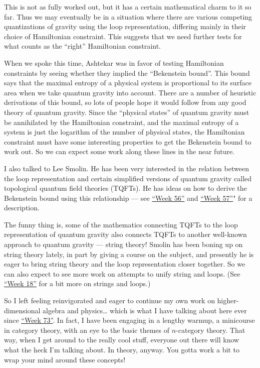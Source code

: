 \documentclass{article}
\begin{document}
This is not as fully worked out, but it has a certain mathematical charm
to it so far. Thus we may eventually be in a situation where there are
various competing quantizations of gravity using the loop
representation, differing mainly in their choice of Hamiltonian
constraint. This suggests that we need further tests for what counts as
the ``right'' Hamiltonian constraint.

When we spoke this time, Ashtekar was in favor of testing Hamiltonian
constraints by seeing whether they implied the ``Bekenstein bound''.
This bound says that the maximal entropy of a physical system is
proportional to its surface area when we take quantum gravity into
account. There are a number of heuristic derivations of this bound, so
lots of people hope it would follow from any good theory of quantum
gravity. Since the ``physical states'' of quantum gravity must be
annihilated by the Hamiltonian constraint, and the maximal entropy of a
system is just the logarithm of the number of physical states, the
Hamiltonian constraint must have some interesting properties to get the
Bekenstein bound to work out. So we can expect some work along these
lines in the near future.

I also talked to Lee Smolin. He has been very interested in the relation
between the loop representation and certain simplified versions of
quantum gravity called topological quantum field theories (TQFTs). He
has ideas on how to derive the Bekenstein bound using this relationship
--- see \href{week56.html}{``Week 56''} and
\protect\hyperlink{week57}{``Week 57''}" for a description.

The funny thing is, some of the mathematics connecting TQFTs to the loop
representation of quantum gravity also connects TQFTs to another
well-known approach to quantum gravity --- string theory! Smolin has
been boning up on string theory lately, in part by giving a course on
the subject, and presently he is eager to bring string theory and the
loop representation closer together. So we can also expect to see more
work on attempts to unify string and loops. (See
\protect\hyperlink{week18}{``Week 18''} for a bit more on strings and
loops.)

So I left feeling reinvigorated and eager to continue my own work on
higher-dimensional algebra and physics\ldots{} which is what I have
talking about here ever since \protect\hyperlink{week73}{``Week 73''}.
In fact, I have been engaging in a lengthy warmup, a minicourse in
category theory, with an eye to the basic themes of \(n\)-category
theory. That way, when I get around to the really cool stuff, everyone
out there will know what the heck I'm talking about. In theory, anyway.
You gotta work a bit to wrap your mind around these concepts!
\end{document}
